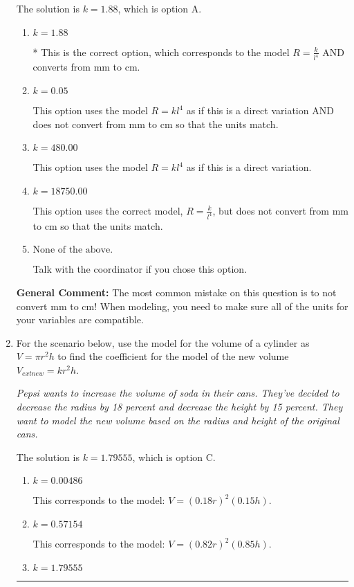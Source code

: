 \documentclass{extbook}[14pt]
\newcommand{\litem}[1]{\item #1

\rule{\textwidth}{0.4pt}}
\begin{document}
\begin{enumerate}
{The solution is \( k = 1.88 \), which is option A.\begin{enumerate}[label=\Alph*.]
\item \( k = 1.88 \)

* This is the correct option, which corresponds to the model $R = \frac{k}{l^{4}}$ AND converts from mm to cm.
\item \( k = 0.05 \)

This option uses the model $R = kl^{4}$ as if this is a direct variation AND does not convert from mm to cm so that the units match.
\item \( k = 480.00 \)

This option uses the model $R = kl^{4}$ as if this is a direct variation.
\item \( k = 18750.00 \)

This option uses the correct model, $R = \frac{k}{l^{4}}$, but does not convert from mm to cm so that the units match.
\item \( \text{None of the above.} \)

Talk with the coordinator if you chose this option.
\end{enumerate}

\textbf{General Comment:} The most common mistake on this question is to not convert mm to cm! When modeling, you need to make sure all of the units for your variables are compatible.
}
\litem{
For the scenario below, use the model for the volume of a cylinder as $V = \pi r^2 h$ to find the coefficient for the model of the new volume $V_{	ext{new}} = k r^2 h$.

\begin{center}
    \textit{ Pepsi wants to increase the volume of soda in their cans. They've decided to decrease the radius by 18 percent and decrease the height by 15 percent. They want to model the new volume based on the radius and height of the original cans. }
\end{center}


The solution is \( k = 1.79555 \), which is option C.\begin{enumerate}[label=\Alph*.]
\item \( k = 0.00486 \)

This corresponds to the model: $V = (0.18 r)^2 (0.15 h)$.
\item \( k = 0.57154 \)

This corresponds to the model: $V = (0.82 r)^2 (0.85 h)$.
\item \( k = 1.79555 \)


\end{enumerate}}
\end{enumerate}
\end{document}
